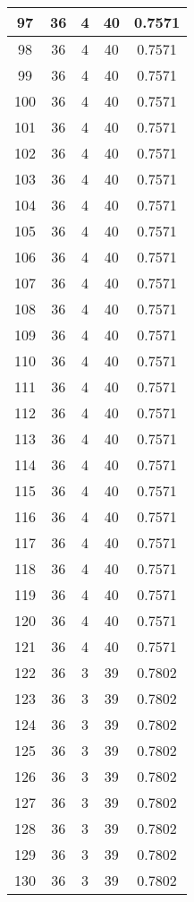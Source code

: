 \documentclass[letterpaper, 12pt]{article}
\begin{document}
\begin{longtable}{|c|c|c|c|c|}
\hline
97 & 36 & 4 & 40 & 0.7571 \\
\hline
98 & 36 & 4 & 40 & 0.7571 \\
\hline
99 & 36 & 4 & 40 & 0.7571 \\
\hline
100 & 36 & 4 & 40 & 0.7571 \\
\hline
101 & 36 & 4 & 40 & 0.7571 \\
\hline
102 & 36 & 4 & 40 & 0.7571 \\
\hline
103 & 36 & 4 & 40 & 0.7571 \\
\hline
104 & 36 & 4 & 40 & 0.7571 \\
\hline
105 & 36 & 4 & 40 & 0.7571 \\
\hline
106 & 36 & 4 & 40 & 0.7571 \\
\hline
107 & 36 & 4 & 40 & 0.7571 \\
\hline
108 & 36 & 4 & 40 & 0.7571 \\
\hline
109 & 36 & 4 & 40 & 0.7571 \\
\hline
110 & 36 & 4 & 40 & 0.7571 \\
\hline
111 & 36 & 4 & 40 & 0.7571 \\
\hline
112 & 36 & 4 & 40 & 0.7571 \\
\hline
113 & 36 & 4 & 40 & 0.7571 \\
\hline
114 & 36 & 4 & 40 & 0.7571 \\
\hline
115 & 36 & 4 & 40 & 0.7571 \\
\hline
116 & 36 & 4 & 40 & 0.7571 \\
\hline
117 & 36 & 4 & 40 & 0.7571 \\
\hline
118 & 36 & 4 & 40 & 0.7571 \\
\hline
119 & 36 & 4 & 40 & 0.7571 \\
\hline
120 & 36 & 4 & 40 & 0.7571 \\
\hline
121 & 36 & 4 & 40 & 0.7571 \\
\hline
122 & 36 & 3 & 39 & 0.7802 \\
\hline
123 & 36 & 3 & 39 & 0.7802 \\
\hline
124 & 36 & 3 & 39 & 0.7802 \\
\hline
125 & 36 & 3 & 39 & 0.7802 \\
\hline
126 & 36 & 3 & 39 & 0.7802 \\
\hline
127 & 36 & 3 & 39 & 0.7802 \\
\hline
128 & 36 & 3 & 39 & 0.7802 \\
\hline
129 & 36 & 3 & 39 & 0.7802 \\
\hline
130 & 36 & 3 & 39 & 0.7802 \\

\end{longtable}
\end{document}
